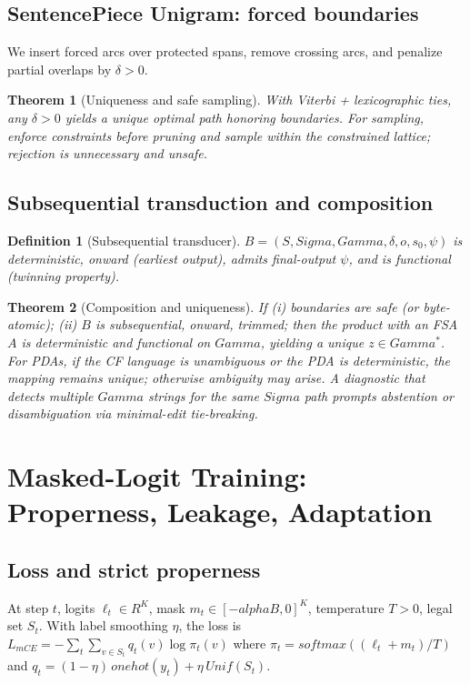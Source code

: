\documentclass{article}
\def\alpha{alpha}%
\def\Gamma{Gamma}%
\def\Sigma{Sigma}%
\def\mathcal#1{#1}%
\def\mathrm#1{#1}%
\def\mathbb#1{#1}%
\newtheorem{definition}{Definition}
\newtheorem{theorem}{Theorem}
\begin{document}
\subsection{SentencePiece Unigram: forced boundaries}
We insert forced arcs over protected spans, remove crossing arcs, and penalize partial overlaps by $\delta>0$.
\begin{theorem}[Uniqueness and safe sampling]\label{thm:uni}
With Viterbi + lexicographic ties, any $\delta>0$ yields a unique optimal path honoring boundaries. For sampling, enforce constraints before pruning and sample within the constrained lattice; rejection is unnecessary and unsafe.
\end{theorem}

\subsection{Subsequential transduction and composition}\label{sec:transducer}
\begin{definition}[Subsequential transducer]
$\mathcal{B}=(S,\Sigma,\Gamma,\delta,o,s_0,\psi)$ is deterministic, onward (earliest output), admits final-output $\psi$, and is functional (twinning property).
\end{definition}

\begin{theorem}[Composition and uniqueness]\label{thm:comp}
If (i) boundaries are safe (or byte-atomic); (ii) $\mathcal{B}$ is subsequential, onward, trimmed; then the product with an FSA $\mathcal{A}$ is deterministic and functional on $\Gamma$, yielding a unique $z\in\Gamma^\ast$. For PDAs, if the CF language is unambiguous or the PDA is deterministic, the mapping remains unique; otherwise ambiguity may arise. A diagnostic that detects multiple $\Gamma$ strings for the same $\Sigma$ path prompts abstention or disambiguation via minimal-edit tie-breaking.
\end{theorem}

\section{Masked-Logit Training: Properness, Leakage, Adaptation}\label{sec:proper}
\subsection{Loss and strict properness}
At step $t$, logits $\ell_t\in\mathbb{R}^K$, mask $m_t\in[-\alpha B,0]^K$, temperature $T>0$, legal set $\mathcal{S}_t$. With label smoothing $\eta$, the loss is
$\mathcal{L}_{\mathrm{mCE}}=-\sum_t \sum_{v\in\mathcal{S}_t} q_t(v) \log \pi_t(v)$
where $\pi_t=\mathrm{softmax}((\ell_t+m_t)/T)$ and $q_t=(1-\eta)\,\mathrm{onehot}(y_t)+\eta\,\mathrm{Unif}(\mathcal{S}_t)$.
\end{document}

